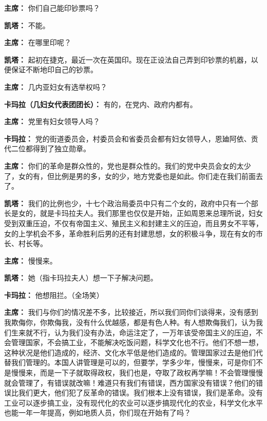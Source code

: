 \begin{duihua}
\item[\textbf{主席：}] 你们自己能印钞票吗？

\item[\textbf{凯塔：}] 不能。

\item[\textbf{主席：}] 在哪里印呢？

\item[\textbf{凯塔：}] 起初在捷克，最近一次在英国印。现在正设法自己弄到印钞票的机器，以便保证不断地印自己的钞票。

\item[\textbf{主席：}] 几内亚妇女有选举权吗？

\item[\textbf{卡玛拉（几妇女代表团团长）：}] 有的，在党内、政府内都有。

\item[\textbf{主席：}] 党里有妇女领导人吗？

\item[\textbf{卡玛拉：}] 党的街道委员会，村委员会和省委员会都有妇女领导人，恩廸阿依、贡代二位都得到了独立勋章。

\item[\textbf{主席：}] 你们的革命是群众性的，党也是群众性的。我们的党中央员会女的太少了，女的有，但比例是男的多，女的少，地方党委也是如此。你们走在我们前面去了。

\item[\textbf{凯塔：}] 我们的比例也少，十七个政治局委员中只有二个女的，政府中只有一个部长是女的，就是卡玛拉夫人。我们那里也仅仅是开始，正如周恩来总理所说，妇女受到双重压迫，不仅有帝国主义、殖民主义和封建主义的压迫，而且男女不平等，女的上学机会不多，革命胜利后男的还有封建思想，女的积极斗争，现在有女的市长、村长等。

\item[\textbf{主席：}] 慢慢来。

\item[\textbf{凯塔：}] 她（指卡玛拉夫人）想一下子解决问题。

\item[\textbf{卡玛拉：}] 他想阻拦。（全场笑）

\item[\textbf{主席：}] 我们与你们的情况差不多，比较接近，所以我们同你们谈得来，没有感到我欺侮你，你欺侮我，没有什么优越感，都是有色人种。有人想欺侮我们，认为我们生来就不行，认为我们没有办法，命运注定了，一万年该受帝国主义的压迫，不会管理国家，不会搞工业，不能解决吃饭问题，科学文化也不行。他们不想一想，这种状况是他们造成的，经济、文化水平低是他们造成的。管理国家过去是他们代替我们管理的。本国人讲管理是可以的，但要学，学多少年，慢慢来，可是你们不是慢慢来，而是一下子就取得政权，我们也是，夺取了政权再学嘛！不会管理慢慢就会管理了，有错误就改嘛！难道只有我们有错误，西方国家没有错误？他们的错误比我们更大，他们犯了反革命的错误。我们根本上没有错误，我们是革命。没有工业可以逐步搞工业，没有现代化的农业可以逐步搞现代化的农业，科学文化水平也能一年一年提高，例如地质人员，你们现在开始有了吗？


\end{duihua}
